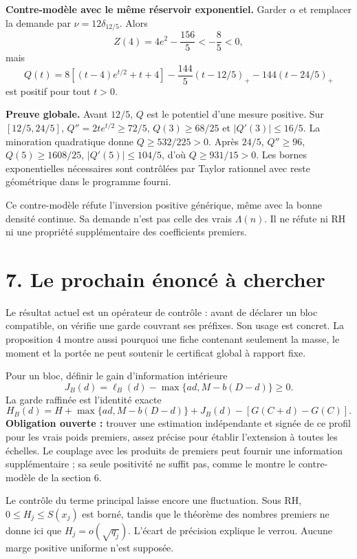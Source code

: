 \documentclass[
  11pt,
  a4paper,
]{article}
\begin{document}
\textbf{Contre-modèle avec le même réservoir exponentiel.} Garder
\(\alpha\) et remplacer la demande par \(\nu=12\delta_{12/5}\). Alors \[
Z(4)=4e^2-\frac{156}{5}<-\frac85<0,
\] mais \[
Q(t)=8[(t-4)e^{t/2}+t+4]
-\frac{144}{5}(t-12/5)_+-144(t-24/5)_+
\] est positif pour tout \(t>0\).

\textbf{Preuve globale.} Avant \(12/5\), \(Q\) est le potentiel d'une
mesure positive. Sur \([12/5,24/5]\), \(Q''=2te^{t/2}\ge72/5\),
\(Q(3)\ge68/25\) et \(|Q'(3)|\le16/5\). La minoration quadratique donne
\(Q\ge532/225>0\). Après \(24/5\), \(Q''\ge96\), \(Q(5)\ge1608/25\),
\(|Q'(5)|\le104/5\), d'où \(Q\ge931/15>0\). Les bornes exponentielles
nécessaires sont contrôlées par Taylor rationnel avec reste géométrique
dans le programme fourni.

Ce contre-modèle réfute l'inversion positive générique, même avec la
bonne densité continue. Sa demande n'est pas celle des vrais
\(\Lambda(n)\). Il ne réfute ni RH ni une propriété supplémentaire des
coefficients premiers.

\newpage

\hypertarget{le-prochain-uxe9noncuxe9-uxe0-chercher}{%
\section{7. Le prochain énoncé à
chercher}\label{le-prochain-uxe9noncuxe9-uxe0-chercher}}

Le résultat actuel est un opérateur de contrôle : avant de déclarer un
bloc compatible, on vérifie une garde couvrant ses préfixes. Son usage
est concret. La proposition 4 montre aussi pourquoi une fiche contenant
seulement la masse, le moment et la portée ne peut soutenir le
certificat global à rapport fixe.

Pour un bloc, définir le gain d'information intérieure \[
J_B(d)=\ell_B(d)-\max\{ad,M-b(D-d)\}\ge0.
\] La garde raffinée est l'identité exacte \[
H_B(d)=H+\max\{ad,M-b(D-d)\}+J_B(d)-[G(C+d)-G(C)].
\] \textbf{Obligation ouverte :} trouver une estimation indépendante et
signée de ce profil pour les vrais poids premiers, assez précise pour
établir l'extension à toutes les échelles. Le couplage avec les produits
de premiers peut fournir une information supplémentaire ; sa seule
positivité ne suffit pas, comme le montre le contre-modèle de la section
6.

Le contrôle du terme principal laisse encore une fluctuation. Sous RH,
\(0\le H_j\le S(x_j)\) est borné, tandis que le théorème des nombres
premiers ne donne ici que \(H_j=o(\sqrt{q_j})\). L'écart de précision
explique le verrou. Aucune marge positive uniforme n'est supposée.
\end{document}
